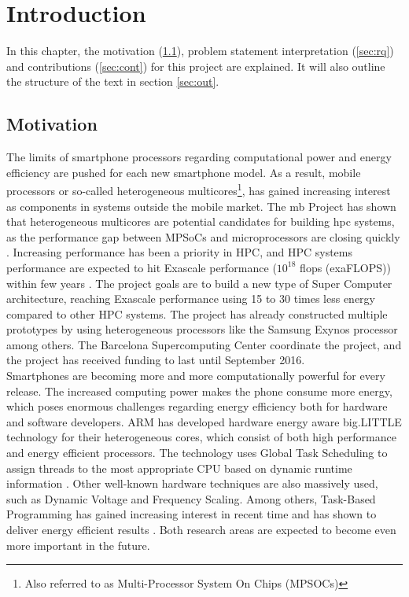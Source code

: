 \chapter{Introduction}
In this chapter, the motivation (\ref{sec:mot}), problem statement interpretation (\ref{sec:rq}) and contributions (\ref{sec:cont}) for this project are explained. It will also outline the structure of the text in section \ref{sec:out}.

\section{Motivation}
\label{sec:mot}
The limits of smartphone processors regarding computational power and energy efficiency are pushed for each new smartphone model. As a result, mobile processors or so-called heterogeneous multicores\footnote{Also referred to as Multi-Processor System On Chips (MPSOCs)}, has gained increasing interest as components in systems outside the mobile market. The \gls{mb} Project \cite{MB} has shown that heterogeneous multicores are potential candidates for building \gls{hpc} systems, as the performance gap between MPSoCs and microprocessors are closing quickly \cite{a:MB:Raj13}. Increasing performance has been a priority in HPC, and HPC systems performance are expected to hit Exascale performance ($10^{18}$ \gls{flops} (exaFLOPS)) within few years \cite{TOP500}. The project goals are to build a new type of Super Computer architecture, reaching Exascale performance using 15 to 30 times less energy compared to other HPC systems. The project has already constructed multiple prototypes by using heterogeneous processors like the Samsung Exynos \cite{EXY} processor among others. The Barcelona Supercomputing Center coordinate the project, and the project has received funding to last until September 2016. \\

Smartphones are becoming more and more computationally powerful for every release. The increased computing power makes the phone consume more energy, which poses enormous challenges regarding energy efficiency both for hardware and software developers. ARM has developed hardware energy aware big.LITTLE technology for their heterogeneous cores, which consist of both high performance and energy efficient processors. The technology uses Global Task Scheduling to assign threads to the most appropriate CPU based on dynamic runtime information \cite{a:ARM:bL}. Other well-known hardware techniques are also massively used, such as Dynamic Voltage and Frequency Scaling. Among others, Task-Based Programming has gained increasing interest in recent time and has shown to deliver energy efficient results \cite{a:Lien2012}. Both research areas are expected to become even more important in the future. \\

